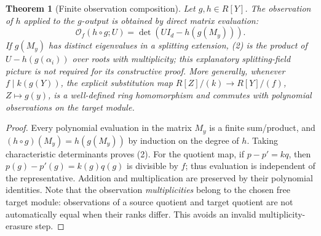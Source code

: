 \documentclass[11pt]{article}
\newtheorem{theorem}{Theorem}[section]
\begin{document}
\begin{theorem}[Finite observation composition]
Let \(g,h\in R[Y]\). The observation of \(h\) applied to the \(g\)-output is obtained by direct matrix evaluation:
\[
\mathcal O_f(h\circ g;U)=\det(UI_d-h(g(M_y))).\tag{2}
\]
If \(g(M_y)\) has distinct eigenvalues in a splitting extension, (2) is the product of \(U-h(g(\alpha_i))\) over roots with multiplicity; this explanatory splitting-field picture is \emph{not} required for its constructive proof. More generally, whenever \(f\mid k(g(Y))\), the explicit substitution map \(R[Z]/(k)\to R[Y]/(f)\), \(Z\mapsto g(y)\), is a well-defined ring homomorphism and commutes with polynomial observations on the target module.
\end{theorem}
\begin{proof}
Every polynomial evaluation in the matrix \(M_y\) is a finite sum/product, and \((h\circ g)(M_y)=h(g(M_y))\) by induction on the degree of \(h\). Taking characteristic determinants proves (2). For the quotient map, if \(p-p'=kq\), then \(p(g)-p'(g)=k(g)q(g)\) is divisible by \(f\); thus evaluation is independent of the representative. Addition and multiplication are preserved by their polynomial identities. Note that the observation \emph{multiplicities} belong to the chosen free target module: observations of a source quotient and target quotient are not automatically equal when their ranks differ. This avoids an invalid multiplicity-erasure step.
\end{proof}
\end{document}
